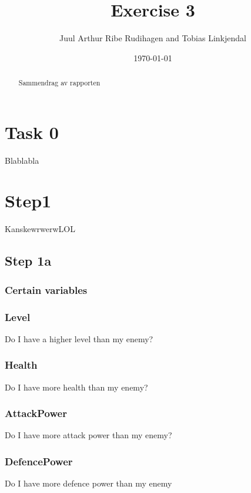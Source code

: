\documentclass[titlepage]{article}
\author{Juul Arthur Ribe Rudihagen and Tobias Linkjendal}
\title{Exercise 3}
\date{\today}
\begin{document}
\maketitle

\renewcommand{\abstractname}{Summary}
\begin{abstract}
Sammendrag av rapporten
\end{abstract}

\tableofcontents

\newpage


\section{Task 0}
Blablabla

\newpage


\section{Step1}
KanskewrwerwLOL

\subsection{Step 1a}
\subsubsection{Certain variables}
\subsubsection*{Level}
Do I have a higher level than my enemy?

\subsubsection*{Health}
Do I have more health than my enemy?

\subsubsection*{AttackPower}
Do I have more attack power than my enemy?

\subsubsection*{DefencePower}
Do I have more defence power than my enemy
\end{document}
